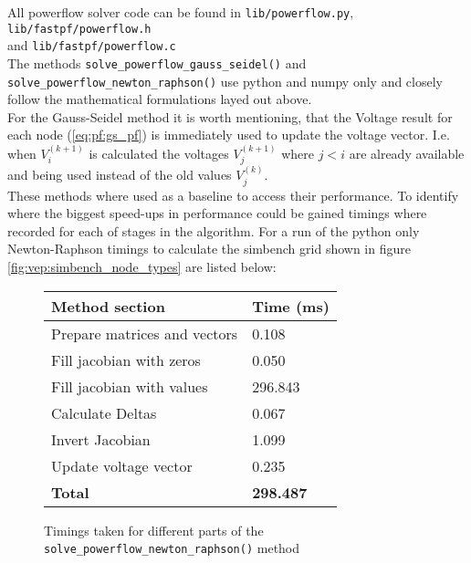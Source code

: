 All powerflow solver code can be found in 
\texttt{lib/powerflow.py}, \texttt{lib/fastpf/powerflow.h}
\\ and
\texttt{lib/fastpf/powerflow.c}\\

The methods \texttt{solve\_powerflow\_gauss\_seidel()}
and \texttt{solve\_powerflow\_newton\_raphson()}
use python and numpy only and closely follow the mathematical formulations layed out above.\\

For the Gauss-Seidel method it is worth mentioning, that the Voltage result for each
node (\ref{eq:pf:gs_pf}) is immediately used to update the voltage vector. I.e. when $V_i^{(k+1)}$
is calculated the voltages $V_{j}^{(k+1)}$ where $j<i$ are already available and being used instead of
the old values $V_{j}^{(k)}$.\\

These methods where used as a baseline to access their performance. To identify where the biggest
speed-ups in performance could be gained timings where recorded for each of stages in the algorithm.
For a run of the python only Newton-Raphson timings to calculate the simbench grid shown in figure
\ref{fig:vep:simbench_node_types} are listed below:

\vspace{.5cm}

\begin{figure}[H]
    \begin{center}
        \begin{tabular}{ll}
            \textbf{Method section} & \textbf{Time (ms)}\\
            \hline
            Prepare matrices and vectors & 0.108\\
            Fill jacobian with zeros &  0.050\\
            Fill jacobian with values & 296.843\\
            Calculate Deltas &      0.067\\
            Invert Jacobian &      1.099\\
            Update voltage vector & 0.235\\
            \hline
            \textbf{Total} & \textbf{298.487}
        \end{tabular}
    \end{center}
\caption{Timings taken for different parts of the \texttt{solve\_powerflow\_newton\_raphson()} method}
\end{figure}
    
